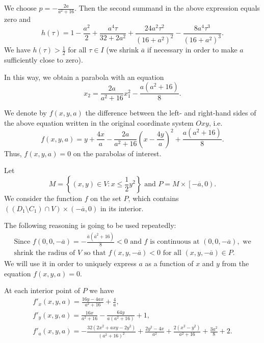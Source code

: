 \documentclass[a4paper]{article}
\begin{document}
We choose $p = -\frac{2a}{a^2+16}$. Then the second summand in the above expression equals zero and $$h(\tau) = 1 - \frac{a^2}{2} + \frac{a^4 \tau}{32 + 2 a^2} + \frac{24 a^2 \tau^2}{(16 + a^2)^2} - \frac{8 a^4 \tau^3}{(16 + a^2)^3}.$$
We have $h(\tau) > \frac{1}{2}$ for all $\tau \in I$ (we shrink $\overline{a}$ if necessary in order to make $a$ sufficiently close to zero).

In this way, we obtain a parabola with an equation $$x_2 = \frac{2a}{a^2+16} x_1^2-\frac{a(a^2+16)}{8}.$$

We denote by $f(x,y,a)$ the difference between the left- and right-hand sides of the above equation written in the original coordinate system $Oxy$, i.e. $$f(x,y,a) = y+\frac{4x}{a} - \frac{2a}{a^2+16} \left(x-\frac{4y}{a}\right)^2+\frac{a(a^2+16)}{8}.$$
Thus, $f(x,y,a)=0$ on the parabolas of interest.

Let $$M = \left\{(x,y) \in V : x \le \frac{1}{2}y^2\right\} \mbox{ and } P=M \times \left[-\overline{a},0\right).$$ 
We consider the function $f$ on the set $P$, which contains $\left(\left(D_1 \setminus C_1\right) \cap V\right) \times \left(-\overline{a},0\right)$ in its interior.

The following reasoning is going to be used repeatedly:   
\begin{equation}\label{star}
    \begin{array}{l}
        \mbox{Since }f(0,0,-\overline{a}) = -\frac{\overline{a}(\overline{a}^2+16)}{8} < 0 \mbox{ and }f \mbox{ is continuous at }(0,0,-\overline{a}), \mbox{ we}\\
        \mbox{shrink the radius of }  V \mbox{ so that }
        f(x,y,-\overline{a}) < 0 \mbox{  for all  } (x,y,-\overline{a}) \in P.
    \end{array}
\end{equation}    
We will use it in order to uniquely express $a$ as a function of $x$ and $y$ from the equation $f(x,y,a)=0$.

At each interior point of $P$ we have
\begin{gather*}
    f'_x (x,y,a) = \frac{16y-4ax}{a^2+16} + \frac{4}{a},\\
    f'_y (x,y,a) = \frac{16x}{a^2+16}-\frac{64y}{a(a^2+16)}+1,\\
    f'_a (x,y,a) = -\frac{32(2x^2+axy-2y^2)}{(a^2+16)^2}+\frac{2y^2-4x}{a^2}+\frac{2(x^2-y^2)}{a^2+16}+\frac{3a^2}{8}+2.
\end{gather*}
\end{document}
